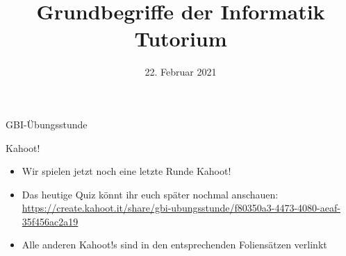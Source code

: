 

\newcommand{\handout}{}



\morescalingdelimiters




\title[GBI-Tutorium \mytutnumber, Woche 14]{Grundbegriffe der Informatik \\ Tutorium \mytutnumber}
\date{22. Februar 2021}

\begin{headframe}
	GBI-Übungsstunde
\end{headframe}


\begin{frame}{Kahoot!}
	\begin{itemize}[<+->]
		\item Wir spielen jetzt noch eine letzte Runde Kahoot!
		\item Das heutige Quiz könnt ihr euch später nochmal anschauen: \\
			\small \url{https://create.kahoot.it/share/gbi-ubungsstunde/f80350a3-4473-4080-aeaf-35f456ac2a19}
		\item Alle anderen Kahoot!s sind in den entsprechenden Foliensätzen verlinkt
	\end{itemize}
\end{frame}

